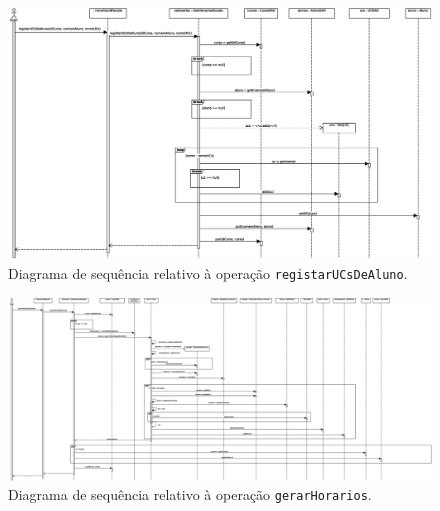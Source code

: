 \documentclass[12pt, a4paper]{article}
\begin{document}
\begin{landscape}
        \begin{figure}[H]
            \centering
            \includegraphics[scale=0.65]{Imagens/Modelos/registarUCsDeAlunoDAO.svg.eps}
            \caption{
                Diagrama de sequência relativo à operação \texttt{registarUCsDeAluno}.
            }
        \end{figure}

        \vspace*{\fill}
        \pagebreak
        \vspace*{\fill}

        \begin{figure}[H]
            \centering
            \includegraphics[scale=0.33]{Imagens/Modelos/gerarHorariosDAO.svg.eps}
            \caption{
                Diagrama de sequência relativo à operação \texttt{gerarHorarios}.
            }
        \end{figure}

        \vspace*{\fill}
        \pagebreak
        \vspace*{\fill}


\end{landscape}
\end{document}
